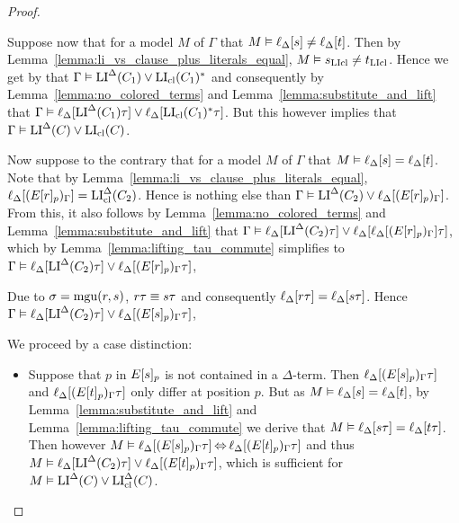 \documentclass[,%
	draft=false,%
	numbers=noendperiod
	11pt,
	a4paper,
	oneside,%
	openany,
]{memoir}
\begin{document}
\begin{proof}
\begin{description}

			Suppose now that for a model $M$ of $\Gamma$ that $M \vDash \ell_{\Delta}[s] \neq \ell_{\Delta}[t]$.
			Then by Lemma~\ref{lemma:li_vs_clause_plus_literals_equal}, 
			$M \vDash s_{\operatorname{LIcl}} \neq t_{\operatorname{LIcl}}$.
			Hence we get by \markA{} that 
			$\Gamma \vDash \operatorname{LI}^\Delta(C_1) \lor \operatorname{LI}_{\operatorname{cl}}(C_1)^*$
			and consequently 
			by Lemma~\ref{lemma:no_colored_terms} and Lemma~\ref{lemma:substitute_and_lift} that 
			$\Gamma \vDash \ell_{\Delta}[\operatorname{LI}^\Delta(C_1)\tau] \lor \ell_{\Delta}[\operatorname{LI}_{\operatorname{cl}}(C_1)^*\tau]$.
			But this however implies that $\Gamma \vDash \operatorname{LI}^\Delta(C) \lor \operatorname{LI}_{\operatorname{cl}}(C)$.

			Now suppose to the contrary that for a model $M$ of $\Gamma$ that $M \entails \lifdeltanovar{s} =\nolinebreak \lifdeltanovar{t}$.
			Note that by Lemma~\ref{lemma:li_vs_clause_plus_literals_equal}, $\ell_{\Delta}[ (E{[r]_{p}})_\Gamma] = \operatorname{LI}_{\operatorname{cl}}^\Delta(C_2)$.
			Hence \markB{} is nothing else than
			$\Gamma \vDash \operatorname{LI}^\Delta(C_2) \lor \ell_{\Delta}[ (E{[r]_{p}})_\Gamma ]$.
			From this, it also follows by Lemma~\ref{lemma:no_colored_terms} and Lemma~\ref{lemma:substitute_and_lift} that
			$\Gamma \vDash \ell_{\Delta}[\operatorname{LI}^\Delta(C_2)\tau] \lor \ell_{\Delta}[\ell_{\Delta}[ (E{[r]_{p}})_\Gamma ]\tau]$, 
			which by Lemma~\ref{lemma:lifting_tau_commute} simplifies to
			$\Gamma \vDash \ell_{\Delta}[\operatorname{LI}^\Delta(C_2)\tau] \lor \ell_{\Delta}[(E{[r]_{p}})_\Gamma \tau]$, 



			Due to $\sigma = \operatorname{mgu}(r, s)$, $r\tau\equiv s\tau$ and consequently $\ell_{\Delta}[r\tau] = \ell_{\Delta}[s\tau]$.
			Hence 
			$\Gamma \vDash \ell_{\Delta}[\operatorname{LI}^\Delta(C_2)\tau] \lor \ell_{\Delta}[(E{[s]_{p}})_\Gamma \tau]$, 


			We proceed by a case distinction:
			\begin{itemize}
				\item
					Suppose that $p$ in $E{[s]_{p}}$ is not contained in a $\Delta$-term.
					Then $\ell_{\Delta}[ (E{[s]_{p}})_\Gamma \tau ]$ and $\ell_{\Delta}[ (E{[t]_{p}})_\Gamma \tau]$ only differ at position $p$.
					But as $M\vDash \ell_{\Delta}[s] = \ell_{\Delta}[t]$, 
					by Lemma~\ref{lemma:substitute_and_lift} and
					Lemma~\ref{lemma:lifting_tau_commute} we derive that
					$M\vDash \ell_{\Delta}[s\tau] = \ell_{\Delta}[t\tau]$. 
					Then however 
					$M\vDash \ell_{\Delta}[ (E{[s]_{p}})_\Gamma \tau ] \operatorname{\Leftrightarrow} \ell_{\Delta}[ (E{[t]_{p}})_\Gamma \tau]$
					and thus
					$M \vDash \ell_{\Delta}[\operatorname{LI}^\Delta(C_2)\tau] \lor \ell_{\Delta}[ (E{[t]_{p}})_\Gamma \tau ]$,
					which is sufficient for
					$M \vDash \operatorname{LI}^\Delta(C) \lor \operatorname{LI}_{\operatorname{cl}}^\Delta(C)$.


\end{itemize}
\end{description}
\end{proof}
\end{document}
